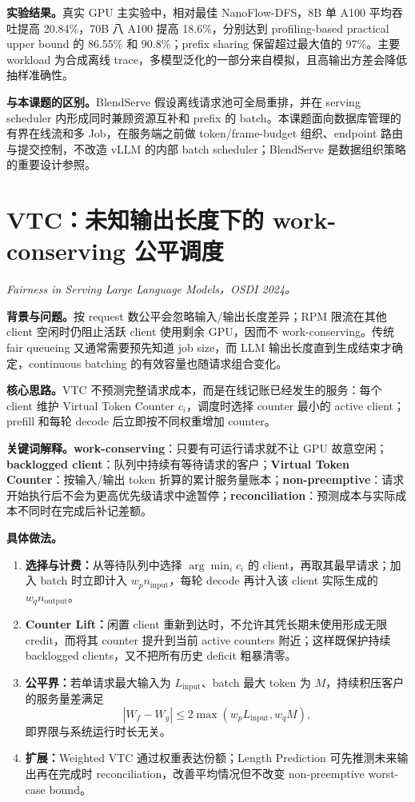 \documentclass[10pt,a4paper]{ctexart}
\let\digestoriginalsection\section
\renewcommand{\section}{\Needspace{7\baselineskip}\digestoriginalsection}
\newcommand{\paperinfo}[1]{\textit{#1}\par}
\newcommand{\field}[1]{\par\noindent\textbf{#1。}\hspace{0.25em}}
\begin{document}
\field{实验结果}真实 GPU 主实验中，相对最佳 NanoFlow-DFS，8B 单 A100 平均吞吐提高 20.84\%，70B 八 A100 提高 18.6\%，分别达到 profiling-based practical upper bound 的 86.55\% 和 90.8\%；prefix sharing 保留超过最大值的 97\%。主要 workload 为合成离线 trace，多模型泛化的一部分来自模拟，且高输出方差会降低抽样准确性。

\field{与本课题的区别}BlendServe 假设离线请求池可全局重排，并在 serving scheduler 内形成同时兼顾资源互补和 prefix 的 batch。本课题面向数据库管理的有界在线流和多 Job，在服务端之前做 token/frame-budget 组织、endpoint 路由与提交控制，不改造 vLLM 的内部 batch scheduler；BlendServe 是数据组织策略的重要设计参照。

\section{VTC：未知输出长度下的 work-conserving 公平调度}
\paperinfo{Fairness in Serving Large Language Models，OSDI 2024。}

\field{背景与问题}按 request 数公平会忽略输入/输出长度差异；RPM 限流在其他 client 空闲时仍阻止活跃 client 使用剩余 GPU，因而不 work-conserving。传统 fair queueing 又通常需要预先知道 job size，而 LLM 输出长度直到生成结束才确定，continuous batching 的有效容量也随请求组合变化。

\field{核心思路}VTC 不预测完整请求成本，而是在线记账已经发生的服务：每个 client 维护 Virtual Token Counter $c_i$，调度时选择 counter 最小的 active client；prefill 和每轮 decode 后立即按不同权重增加 counter。

\field{关键词解释}\textbf{work-conserving}：只要有可运行请求就不让 GPU 故意空闲；\textbf{backlogged client}：队列中持续有等待请求的客户；\textbf{Virtual Token Counter}：按输入/输出 token 折算的累计服务量账本；\textbf{non-preemptive}：请求开始执行后不会为更高优先级请求中途暂停；\textbf{reconciliation}：预测成本与实际成本不同时在完成后补记差额。

\field{具体做法}
\begin{enumerate}
  \item \textbf{选择与计费：}从等待队列中选择 $\arg\min_i c_i$ 的 client，再取其最早请求；加入 batch 时立即计入 $w_p n_{\text{input}}$，每轮 decode 再计入该 client 实际生成的 $w_q n_{\text{output}}$。
  \item \textbf{Counter Lift：}闲置 client 重新到达时，不允许其凭长期未使用形成无限 credit，而将其 counter 提升到当前 active counters 附近；这样既保护持续 backlogged clients，又不把所有历史 deficit 粗暴清零。
  \item \textbf{公平界：}若单请求最大输入为 $L_{\text{input}}$、batch 最大 token 为 $M$，持续积压客户的服务量差满足
  \[
    |W_f-W_g|\leq 2\max\!\left(w_pL_{\text{input}},w_qM\right),
  \]
  即界限与系统运行时长无关。
  \item \textbf{扩展：}Weighted VTC 通过权重表达份额；Length Prediction 可先推测未来输出再在完成时 reconciliation，改善平均情况但不改变 non-preemptive worst-case bound。
\end{enumerate}
\end{document}
